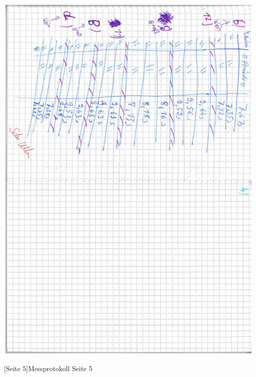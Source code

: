 \documentclass[12pt,a4paper,]{scrreprt}
\begin{document}
        \begin{center}
    		\includegraphics[scale=0.7]{5.pdf}
    	\end{center}
    	[Seite 5]{Messprotokoll Seite 5}
    	\pagebreak
\end{document}
